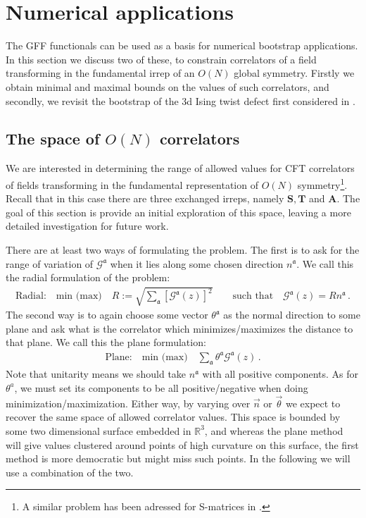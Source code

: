 \documentclass[12pt]{article}
\numberwithin{equation}{section}
\newcommand{\bea}{\begin{eqnarray}}
\newcommand{\eea}{\end{eqnarray}}
\newcommand{\mbf}{\mathbf}
\newcommand{\mf}[1]{\mathfrak #1}
\begin{document}
	
	
	
	
	\section{Numerical applications}\label{sec:numerics}
	
	The GFF functionals can be used as a basis for numerical bootstrap applications. In this section we discuss two of these, to constrain correlators of a field transforming in the fundamental irrep of an $O(N)$ global symmetry. Firstly we obtain minimal and maximal bounds on the values of such correlators, and secondly, we revisit the bootstrap of the 3d Ising twist defect first considered in \cite{ Gaiotto:2013nva}. 
	
	
	\subsection{The space of $O(N)$ correlators}	
	

	
	We are interested in determining the range of allowed values for CFT correlators of fields transforming in the fundamental representation of $O(N)$ symmetry\footnote{A similar problem has been adressed for S-matrices in \cite{Cordova:2019lot}.}. 	 Recall that in this case there are three exchanged irreps, namely $\mbf S,\mbf T$ and $\mbf A$. The goal of this section is provide an initial exploration of this space, leaving a more detailed investigation for future work.
	
	There are at least two ways of formulating the problem. The first is to ask for the range of variation of $\mathcal G^{\mf a}$ when it lies along some chosen direction $n^{\mf a}$. We call this the radial formulation of the problem:
	\bea
    \mbox{Radial:}\quad \mbox{min (max)}\quad	R:=\sqrt{\sum_{\mf a}[\mathcal G^{\mf a}(z)]^2}\qquad \mbox{such that}\quad \mathcal G^{\mf a}(z)=R n^{\mf a}\,.
    \eea
	The second way is to again choose some vector $\theta^{\mf a}$ as the normal direction to some plane and ask what is the correlator which minimizes/maximizes the distance to that plane. We call this the plane formulation:
	\bea
	\mbox{Plane:}\quad \mbox{min (max)} \quad \sum_{\mf a}\theta^{\mf a}\mathcal G^{\mf a}(z)\,.
	\eea
	Note that unitarity means we should take $n^{\mf a}$ with all positive components. As for $\theta^a$, we must set its components to be all positive/negative when doing minimization/maximization. Either way, by varying over  $\vec n$ or $\vec \theta$ we expect to recover the same space of allowed correlator values. This space is bounded by some two dimensional surface embedded in $\mathbb R^3$, and whereas the plane method will give values clustered around points of high curvature on this surface, the first method is more democratic but might miss such points. In the following we will use a combination of the two. 
	
\end{document}

